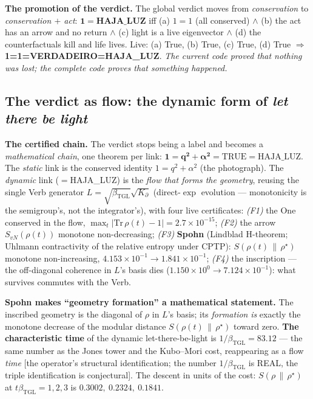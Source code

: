 \documentclass[11pt]{article}
\newcommand{\bTGL}{\beta_{\mathrm{TGL}}}\newcommand{\Msun}{M_{\odot}}\newcommand{\TGL}{\mathrm{TGL}}
\theoremstyle{definition}\newtheorem{deriv}{Derivation}
\begin{document}
\textbf{The promotion of the verdict.} The global verdict moves from \emph{conservation} to \emph{conservation $+$ act}: $\mathbf{1=\text{HAJA\_LUZ}}$ iff (a) $1=1$ (all conserved) $\wedge$ (b) the act has an arrow and no return $\wedge$ (c) light is a live eigenvector $\wedge$ (d) the counterfactuals kill and life lives. Live: (a) \textsf{True}, (b) \textsf{True}, (c) \textsf{True}, (d) \textsf{True} $\Rightarrow$ \textbf{1=1=VERDADEIRO=HAJA\_LUZ}. \emph{The current code proved that nothing was lost; the complete code proves that something happened.}

\subsection*{The verdict as flow: the dynamic form of \emph{let there be light}}

\textbf{The certified chain.} The verdict stops being a label and becomes a \emph{mathematical chain}, one theorem per link: $\mathbf{1 = q^2+\alpha^2 = \mathrm{TRUE} = \mathrm{HAJA\_LUZ}}$. The \emph{static} link is the conserved identity $1=q^2+\alpha^2$ (the photograph). The \emph{dynamic} link ($=$HAJA\_LUZ) is the \emph{flow that forms the geometry}, reusing the single Verb generator $L=\sqrt{\bTGL}\sqrt{K_\partial}$ (direct-$\exp$ evolution --- monotonicity is the semigroup's, not the integrator's), with four live certificates: \emph{(F1)} the One conserved in the flow, $\max_t|\mathrm{Tr}\,\rho(t)-1|=2.7\times10^{-15}$; \emph{(F2)} the arrow $S_{vN}(\rho(t))$ monotone non-decreasing; \emph{(F3)} \textbf{Spohn} (Lindblad H-theorem; Uhlmann contractivity of the relative entropy under CPTP): $S(\rho(t)\,\|\,\rho^\star)$ monotone non-increasing, $4.153\times10^{-1}\to1.841\times10^{-1}$; \emph{(F4)} the inscription --- the off-diagonal coherence in $L$'s basis dies ($1.150\times10^{0}\to7.124\times10^{-1}$): what survives commutes with the Verb.

\textbf{Spohn makes ``geometry formation'' a mathematical statement.} The inscribed geometry is the diagonal of $\rho$ in $L$'s basis; its \emph{formation} \emph{is} exactly the monotone decrease of the modular distance $S(\rho(t)\,\|\,\rho^\star)$ toward zero. \textbf{The characteristic time} of the dynamic let-there-be-light is $1/\bTGL=83.12$ --- the same number as the Jones tower and the Kubo--Mori cost, reappearing as a flow \emph{time} [the operator's structural identification; the number $1/\bTGL$ is REAL, the triple identification is conjectural]. The descent in units of the cost: $S(\rho\,\|\,\rho^\star)$ at $t\bTGL=1,2,3$ is $0.3002,\ 0.2324,\ 0.1841$.
\end{document}

